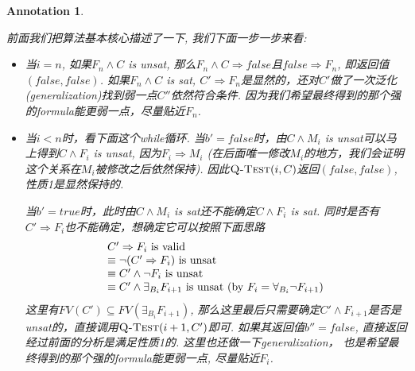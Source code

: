 \documentclass{article}
\newtheorem{annotation}[theorem]{Annotation}
\begin{document}
\begin{annotation}
\begin{itemize}
    前面我们把算法基本核心描述了一下, 我们下面一步一步来看:
    \begin{itemize}
        \item 当$i = n$, 如果$F_n \wedge C$ is unsat, 那么$F_n \wedge C \Rightarrow false$且$false \Rightarrow F_n$, 即返回值$(false, false)$. 如果$F_n \wedge C$ is sat, $C' \Rightarrow F_n$是显然的，还对$C'$做了一次泛化(generalization)找到弱一点$C''$依然符合条件. 因为我们希望最终得到的那个强的formula能更弱一点，尽量贴近$F_n$. 
        \item 当$i < n$时，看下面这个while循环. 当$b' = false$时，由$C \wedge M_i$ is unsat可以马上得到$C \wedge F_i$ is unsat, 因为$F_i \Rightarrow M_i$ (在后面唯一修改$M_i$的地方，我们会证明这个关系在$M_i$被修改之后依然保持). 因此$\textsc{Q-Test}(i, C)$返回$(false, false)$, 性质1是显然保持的.
        
        当$b' = true$时，此时由$C \wedge M_i$ is sat还不能确定$C \wedge F_i$ is sat. 同时是否有$C' \Rightarrow  F_i$也不能确定，想确定它可以按照下面思路
        \[
            \begin{tabular}{l}
                $C' \Rightarrow  F_i$ is valid \\
                $\equiv \neg (C' \Rightarrow F_i)$ is unsat \\
                $\equiv C' \wedge \neg F_i$ is unsat \\
                $\equiv C' \wedge \exists_{B_i} F_{i+1}$ is unsat (by $F_i = \forall_{B_i} \neg F_{i+1}$)\\
            \end{tabular}
        \]
        这里有$FV(C') \subseteq FV(\exists_{B_i} F_{i+1})$, 那么这里最后只需要确定$C' \wedge F_{i+1}$是否是unsat的，直接调用$\textsc{Q-Test}(i+1, C')$即可. 如果其返回值$b'' = false$, 直接返回经过前面的分析是满足性质1的. 这里也还做一下generalization， 也是希望最终得到的那个强的formula能更弱一点, 尽量贴近$F_i$. 
        

\end{itemize}
\end{itemize}
\end{annotation}
\end{document}
